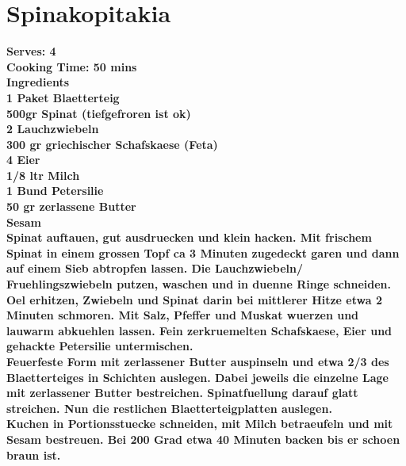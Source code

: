 \documentclass[18pt, oneside]{book}
\begin{document}
\begin{quote}
  \it{} \normalfont
\end{quote}
 
\section{Spinakopitakia}
\bf{Serves: 4} \\
\bf{Cooking Time: 50 mins} \\

\bf{Ingredients} \normalfont \\
1 Paket Blaetterteig \\
500gr Spinat (tiefgefroren ist ok) \\
2 Lauchzwiebeln \\
300 gr griechischer Schafskaese (Feta) \\
4 Eier \\
1/8 ltr Milch \\
1 Bund Petersilie \\
50 gr zerlassene Butter \\
Sesam \\

Spinat auftauen, gut ausdruecken und klein hacken. Mit frischem Spinat in einem grossen Topf ca 3 Minuten zugedeckt garen und dann auf einem Sieb abtropfen lassen. Die Lauchzwiebeln/ Fruehlingszwiebeln putzen, waschen und in duenne Ringe schneiden. \\

Oel erhitzen, Zwiebeln und Spinat darin bei mittlerer Hitze etwa 2 Minuten schmoren. Mit Salz, Pfeffer und Muskat wuerzen und lauwarm abkuehlen lassen. Fein zerkruemelten Schafskaese, Eier und gehackte Petersilie untermischen. \\

Feuerfeste Form mit zerlassener Butter auspinseln und etwa 2/3 des Blaetterteiges in Schichten auslegen. Dabei jeweils die einzelne Lage mit zerlassener Butter bestreichen.  Spinatfuellung darauf glatt streichen. Nun die restlichen  Blaetterteigplatten auslegen. \\

Kuchen in Portionsstuecke schneiden, mit Milch betraeufeln und mit Sesam bestreuen. Bei 200 Grad etwa 40 Minuten backen bis er schoen braun ist. \\
\end{document}
